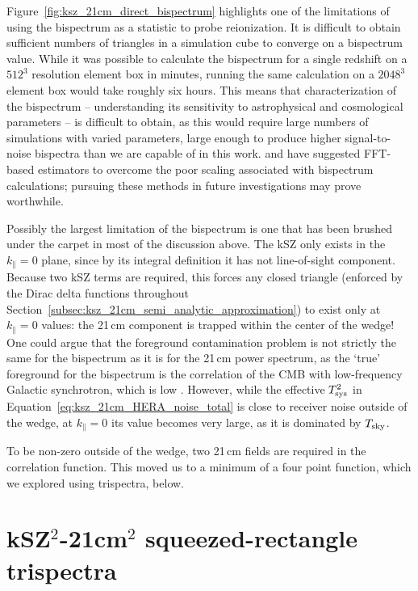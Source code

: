Figure~\ref{fig:ksz_21cm_direct_bispectrum} highlights one of the limitations of using the bispectrum as a statistic to probe reionization. It is difficult to obtain sufficient numbers of triangles in a simulation cube to converge on a bispectrum value. While it was possible to calculate the bispectrum for a single redshift on a $512^3$ resolution element box in minutes, running the same calculation on a $2048^3$ element box would take roughly six hours. This means that characterization of the bispectrum -- understanding its sensitivity to astrophysical and cosmological parameters -- is difficult to obtain, as this would require large numbers of simulations with varied parameters, large enough to produce higher signal-to-noise bispectra than we are capable of in this work. \cite{Sefusatti.16} and \cite{Watkinson.17} have suggested FFT-based estimators to overcome the poor scaling associated with bispectrum calculations; pursuing these methods in future investigations may prove worthwhile.

Possibly the largest limitation of the bispectrum is one that has been brushed under the carpet in most of the discussion above. The kSZ only exists in the $k_{\parallel}=0$ plane, since by its integral definition it has not line-of-sight component. Because two kSZ terms are required, this forces any closed triangle (enforced by the Dirac delta functions throughout Section~\ref{subsec:ksz_21cm_semi_analytic_approximation}) to exist only at $k_{\parallel}=0$ values: the 21\,cm component is trapped within the center of the wedge! One could argue that the foreground contamination problem is not strictly the same for the bispectrum as it is for the 21\,cm power spectrum, as the `true' foreground for the bispectrum is the correlation of the CMB with low-frequency Galactic synchrotron, which is low \citep[e.g.][]{Ichiki.14}. However, while the effective $T^2_{\rm sys}$ in Equation~\ref{eq:ksz_21cm_HERA_noise_total} is close to receiver noise outside of the wedge, at $k_{\parallel}=0$ its value becomes very large, as it is dominated by $T_{\rm sky}$. 

To be non-zero outside of the wedge, two 21\,cm fields are required in the correlation function. This moved us to a minimum of a four point function, which we explored using trispectra, below.

\section{kSZ$^2$-21cm$^2$ squeezed-rectangle trispectra}
\label{sec:trispec}

